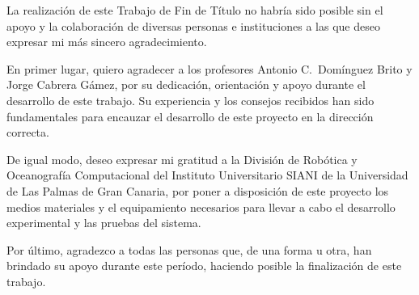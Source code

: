 \begin{flushleft}
La realización de este Trabajo de Fin de Título no habría sido posible sin el apoyo y la colaboración de diversas personas e instituciones a las que deseo expresar mi más sincero agradecimiento.

En primer lugar, quiero agradecer a los profesores Antonio C.\ Domínguez Brito y Jorge Cabrera Gámez, por su dedicación, orientación y apoyo durante el desarrollo de este trabajo. Su experiencia y los consejos recibidos han sido fundamentales para encauzar el desarrollo de este proyecto en la dirección correcta.

De igual modo, deseo expresar mi gratitud a la División de Robótica y Oceanografía Computacional del Instituto Universitario SIANI de la Universidad de Las Palmas de Gran Canaria, por poner a disposición de este proyecto los medios materiales y el equipamiento necesarios para llevar a cabo el desarrollo experimental y las pruebas del sistema.

Por último, agradezco a todas las personas que, de una forma u otra, han brindado su apoyo durante este período, haciendo posible la finalización de este trabajo.
\end{flushleft}
